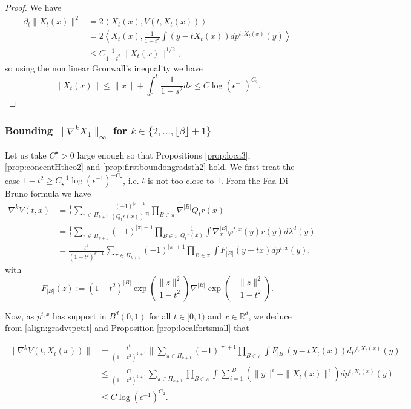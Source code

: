 \documentclass{article}
\begin{document}
\begin{proof}
We have 
\begin{align*}
  \partial_t \|X_t(x)\|^2&=2\left\langle X_t(x), V(t,X_t(x))\right\rangle\\
  &=2\left\langle X_t(x), \frac{1}{1-t^2} \int (y-tX_t(x))dp^{t,X_t(x)}(y)\right\rangle\\
  & \leq C\frac{1}{1-t^2} \|X_t(x)\|^{1/2}, 
\end{align*}
so using the non linear Gronwall's inequality \citep{dragomir2003some} we have 
$$ \|X_t(x)\|\leq \|x\| +\int_0^t \frac{1}{1-s^2}ds\leq  C\log(\epsilon^{-1})^{C_2}.$$
\end{proof}

\subsubsection{Bounding $\|\nabla^k X_1\|_\infty$ for $k\in\{2,...,\lfloor \beta \rfloor +1\}$}\label{sec:evertogether3}
Let us take $C^\star>0$ large enough so that  Propositions \ref{prop:loca3}, \ref{prop:concentHtheo2} and \ref{prop:firstboundongradsth2} hold. We first treat the case $1-t^2\geq C^{-1}_\star\log(\epsilon^{-1})^{-C_\star}$, i.e. $t$ is not too close to $1$. From the Faa Di Bruno formula we have 
\begin{align}\label{align:gradvtpetit}
    \nabla^{k} V(t,x)&=\frac{1}{t}\sum_{\pi \in \Pi_{k+1}} \frac{(-1)^{|\pi|+1}}{(Q_{t} r(x))^{|\pi|}} \prod_{B\in \pi} \nabla^{|B|} Q_{t} r(x)\nonumber \\
    & = \frac{1}{t}\sum_{\pi \in \Pi_{k+1}} (-1)^{|\pi|+1} \prod_{B\in \pi} \frac{1}{Q_{t} r(x)} \int \nabla^{|B|}_x\varphi^{t,x}(y)r(y)d\lambda^d(y)\nonumber\\
    & = \frac{t^{k}}{(1-t^2)^{k+1}}\sum_{\pi \in \Pi_{k+1}} (-1)^{|\pi|+1} \prod_{B\in \pi} \int F_{|B|}(y-tx)dp^{t,x}(y),
\end{align}
with $$ F_{|B|}(z):=(1-t^2)^{|B|}\exp(\frac{\|z\|^2}{1-t^2})\nabla^{|B|} \exp(-\frac{\|z\|^2}{1-t^2}).$$

Now, as $p^{t,x}$ has support in $B^d(0,1)$ for all $t\in [0,1)$ and $x\in \mathbb{R}^d$, we deduce from \eqref{align:gradvtpetit} and Proposition \ref{prop:localfortsmall} that 

\begin{align*}\|\nabla^{k} V(t,X_t(x))\|&=
    \frac{t^{k}}{(1-t^2)^{k+1}}\|\sum_{\pi \in \Pi_{k+1}} (-1)^{|\pi|+1} \prod_{B\in \pi} \int F_{|B|}(y-tX_t(x))dp^{t,X_t(x)}(y)\|\\
    & \leq \frac{C}{(1-t^2)^{k+1}}\sum_{\pi \in \Pi_{k+1}}  \prod_{B\in \pi} \int \sum_{i=1}^{|B|}(\|y\|^i+\|X_t(x)\|^i)dp^{t,X_t(x)}(y)\\
    & \leq  C\log(\epsilon^{-1})^{C_2}.
\end{align*}
\end{document}
